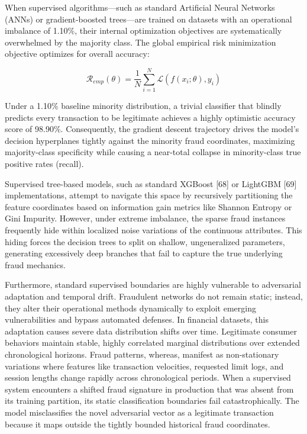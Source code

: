 \documentclass[11pt,a4paper]{report}
\begin{document}
When supervised algorithms---such as standard Artificial Neural Networks (ANNs) or gradient-boosted trees---are trained on datasets with an operational imbalance of 1.10\%, their internal optimization objectives are systematically overwhelmed by the majority class. The global empirical risk minimization objective optimizes for overall accuracy:

\begin{equation}
\mathcal{R}_{emp}(\theta)=\frac{1}{N}\sum_{i=1}^{N}\mathcal{L}(f(x_{i};\theta),y_{i})
\end{equation}

Under a 1.10\% baseline minority distribution, a trivial classifier that blindly predicts every transaction to be legitimate achieves a highly optimistic accuracy score of 98.90\%. Consequently, the gradient descent trajectory drives the model's decision hyperplanes tightly against the minority fraud coordinates, maximizing majority-class specificity while causing a near-total collapse in minority-class true positive rates (recall). 

Supervised tree-based models, such as standard XGBoost [68] or LightGBM [69] implementations, attempt to navigate this space by recursively partitioning the feature coordinates based on information gain metrics like Shannon Entropy or Gini Impurity. However, under extreme imbalance, the sparse fraud instances frequently hide within localized noise variations of the continuous attributes. This hiding forces the decision trees to split on shallow, ungeneralized parameters, generating excessively deep branches that fail to capture the true underlying fraud mechanics. 

Furthermore, standard supervised boundaries are highly vulnerable to adversarial adaptation and temporal drift. Fraudulent networks do not remain static; instead, they alter their operational methods dynamically to exploit emerging vulnerabilities and bypass automated defenses. In financial datasets, this adaptation causes severe data distribution shifts over time. Legitimate consumer behaviors maintain stable, highly correlated marginal distributions over extended chronological horizons. Fraud patterns, whereas, manifest as non-stationary variations where features like transaction velocities, requested limit logs, and session lengths change rapidly across chronological periods. When a supervised system encounters a shifted fraud signature in production that was absent from its training partition, its static classification boundaries fail catastrophically. The model misclassifies the novel adversarial vector as a legitimate transaction because it maps outside the tightly bounded historical fraud coordinates. 
\end{document}
